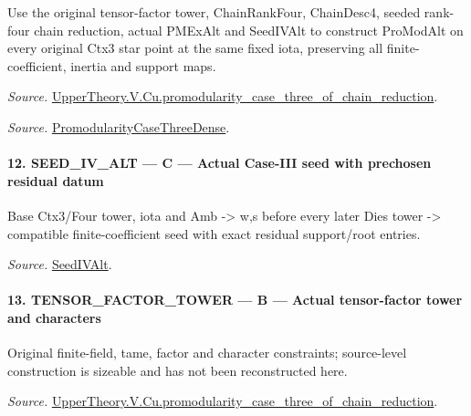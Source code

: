 Use the original tensor-factor tower, ChainRankFour, ChainDesc4, seeded rank-four chain reduction, actual PMExAlt and SeedIVAlt to construct ProModAlt on every original Ctx3 star point at the same fixed iota, preserving all finite-coefficient, inertia and support maps.

\emph{Source.} \href{https://github.com/CocoSgt/riemann-hypothesis-lean/blob/7cbf7a0c32fca1badf05931879a37c3f8a2b03b4/src/Development/AutomorphicArithmetic/AutomorphicVarieties/ModularityArgument/ThresholdArguments/DenseThresholdCases/PromodularityCaseThreeOfLemmas.lean#L131-L153}{UpperTheory.V.Cu.promodularity\_\allowbreak case\_\allowbreak three\_\allowbreak of\_\allowbreak chain\_\allowbreak reduction}.

\emph{Source.} \href{https://github.com/CocoSgt/riemann-hypothesis-lean/blob/7cbf7a0c32fca1badf05931879a37c3f8a2b03b4/src/Development/AutomorphicArithmetic/AutomorphicVarieties/ModularityArgument/ThresholdArguments/DenseThresholdCases/PromodularityCaseThree.lean#L40-L42}{PromodularityCaseThreeDense}.



\paragraph{12. SEED\_\allowbreak IV\_\allowbreak ALT — C — Actual Case-III seed with prechosen residual datum}

Base Ctx3/Four tower, iota and Amb -> w,s before every later Dies tower -> compatible finite-coefficient seed with exact residual support/root entries.

\emph{Source.} \href{https://github.com/CocoSgt/riemann-hypothesis-lean/blob/7cbf7a0c32fca1badf05931879a37c3f8a2b03b4/src/Development/AutomorphicArithmetic/AutomorphicVarieties/ModularityArgument/ThresholdArguments/DenseThresholdCases/PromodularityCaseThree.lean#L19-L25}{SeedIVAlt}.



\paragraph{13. TENSOR\_\allowbreak FACTOR\_\allowbreak TOWER — B — Actual tensor-factor tower and characters}

Original finite-field, tame, factor and character constraints; source-level construction is sizeable and has not been reconstructed here.

\emph{Source.} \href{https://github.com/CocoSgt/riemann-hypothesis-lean/blob/7cbf7a0c32fca1badf05931879a37c3f8a2b03b4/src/Development/AutomorphicArithmetic/AutomorphicVarieties/ModularityArgument/ThresholdArguments/DenseThresholdCases/PromodularityCaseThreeOfLemmas.lean#L131-L153}{UpperTheory.V.Cu.promodularity\_\allowbreak case\_\allowbreak three\_\allowbreak of\_\allowbreak chain\_\allowbreak reduction}.



